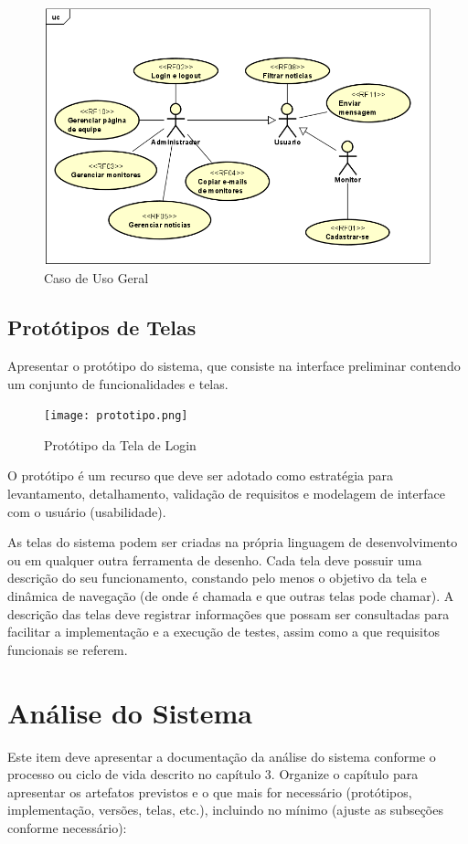 \documentclass[a4paper,12pt]{article}
\begin{document}
\begin{figure} [h]
    \centering
    \includegraphics[width=1\linewidth]{caso_de_usoGeral.png}
    \caption{Caso de Uso Geral}
    \label{fig:enter-label}
\end{figure}

\subsection{Protótipos de Telas}
Apresentar o protótipo do sistema, que consiste na interface preliminar contendo um conjunto de funcionalidades e telas. 

\begin{figure}[h]
    \centering
    \texttt{[image: prototipo.png]}
    \caption{Protótipo da Tela de Login}
    \label{fig:prototipo_login}
\end{figure}

O protótipo é um recurso que deve ser adotado como estratégia para levantamento, detalhamento, validação de requisitos e modelagem de interface com o usuário (usabilidade).

As telas do sistema podem ser criadas na própria linguagem de desenvolvimento ou em qualquer outra ferramenta de desenho. Cada tela deve possuir uma descrição do seu funcionamento, constando pelo menos o objetivo da tela e dinâmica de navegação (de onde é chamada e que outras telas pode chamar). A descrição das telas deve registrar informações que possam ser consultadas para facilitar a implementação e a execução de testes, assim como a que requisitos funcionais se referem.

\newpage
\section{Análise do Sistema}
Este item deve apresentar a documentação da análise do sistema conforme o processo ou ciclo de vida descrito no capítulo 3. Organize o capítulo para apresentar os artefatos previstos e o que mais for necessário (protótipos, implementação, versões, telas, etc.), incluindo no mínimo (ajuste as subseções conforme necessário):
\end{document}
